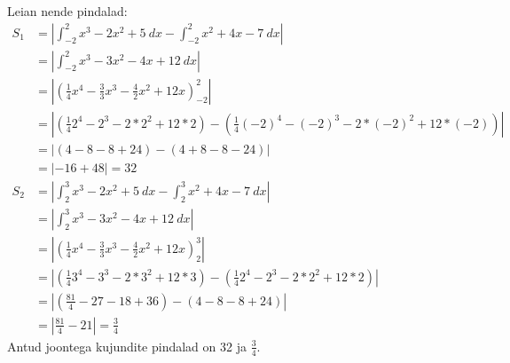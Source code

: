 \documentclass{article}
\begin{document}
Leian nende pindalad:
\begin{equation*}
\begin{aligned}
S_1&=\left|\int_{-2}^2x^3-2x^2+5\ dx-\int_{-2}^2x^2+4x-7\ dx\right|\\
&=\left|\int_{-2}^2x^3-3x^2-4x+12\ dx\right|\\
&=\left|\left(\frac{1}{4}x^4-\frac{3}{3}x^3-\frac{4}{2}x^2+12x\right)_{-2}^2\right|\\
&=\left|\left(\frac{1}{4}2^4-2^3-2*2^2+12*2\right)-\left(\frac{1}{4}(-2)^4-(-2)^3-2*(-2)^2+12*(-2)\right)\right|\\
&=\left|\left(4-8-8+24\right)-\left(4+8-8-24\right)\right|\\
&=\left|-16+48\right|=32\\
S_2&=\left|\int_2^3x^3-2x^2+5\ dx-\int_2^3x^2+4x-7\ dx\right|\\
&=\left|\int_2^3x^3-3x^2-4x+12\ dx\right|\\
&=\left|\left(\frac{1}{4}x^4-\frac{3}{3}x^3-\frac{4}{2}x^2+12x\right)_2^3\right|\\
&=\left|\left(\frac{1}{4}3^4-3^3-2*3^2+12*3\right)-\left(\frac{1}{4}2^4-2^3-2*2^2+12*2\right)\right|\\
&=\left|\left(\frac{81}{4}-27-18+36\right)-\left(4-8-8+24\right)\right|\\
&=\left|\frac{81}{4}-21\right|=\frac{3}{4}
\end{aligned}
\end{equation*}
Antud joontega kujundite pindalad on 32 ja $\frac{3}{4}$.\\
\end{document}
